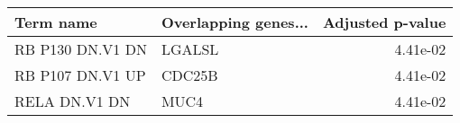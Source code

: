 \begin{tabular}{llr}
\toprule
       Term name & Overlapping genes... &  Adjusted p-value \\
\midrule
RB P130 DN.V1 DN &               LGALSL &          4.41e-02 \\
RB P107 DN.V1 UP &               CDC25B &          4.41e-02 \\
   RELA DN.V1 DN &                 MUC4 &          4.41e-02 \\
\bottomrule
\end{tabular}

